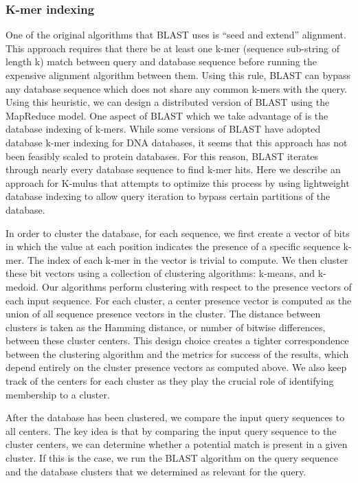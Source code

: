 \documentclass[12pt,\mydriver]{thesis}
\begin{document}
\subsubsection{K-mer indexing}
One of the original algorithms that BLAST uses is ``seed and extend'' alignment. This approach requires that there be at least one k-mer (sequence sub-string of length k) match between query and database sequence before running the expensive alignment algorithm between them\cite{altschul1990basic}. Using this rule, BLAST can bypass any database sequence which does not share any common k-mers with the query. Using this heuristic, we can design a distributed version of BLAST using the MapReduce model. One aspect of BLAST which we take advantage of is the database indexing of k-mers. While some versions of BLAST have adopted database k-mer indexing for DNA databases, it seems that this approach has not been feasibly scaled to protein databases\cite{morgulis2008database}. For this reason, BLAST iterates through nearly every database sequence to find k-mer hits. Here we describe an approach for K-mulus that attempts to optimize this process by using lightweight database indexing to allow query iteration to bypass certain partitions of the database.

In order to cluster the database, for each sequence, we first create a vector of bits in which the value at each position indicates the presence of a specific sequence k-mer. The index of each k-mer in the vector is trivial to compute.
We then cluster these bit vectors using a collection of clustering algorithms: k-means\cite{hartigan1979algorithm}, and k-medoid\cite{van2003new}.
Our algorithms perform clustering with respect to the presence vectors of each input sequence. For each cluster, a center presence vector is computed as the union of all sequence presence vectors in the cluster. The distance between clusters is taken as the Hamming distance, or number of bitwise differences, between these cluster centers. This design choice creates a tighter correspondence between the clustering algorithm and the metrics for success of the results, which depend entirely on the cluster presence vectors as computed above.
We also keep track of the centers for each cluster as they play the crucial role of identifying membership to a cluster.

After the database has been clustered, we compare the input query sequences to all centers. The key idea is that by comparing the input query sequence to the cluster centers, we can determine whether a potential match is present in a given cluster. If this is the case, we run the BLAST algorithm on the query sequence and the database clusters that we determined as relevant for the query.
\end{document}
